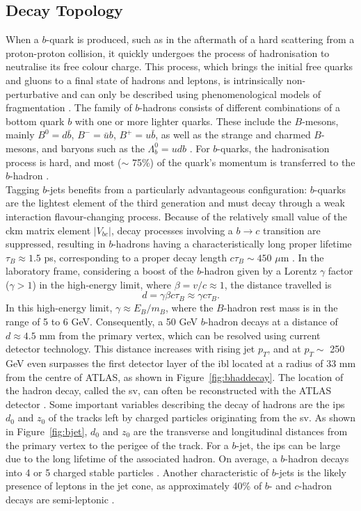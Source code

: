 \subsection{Decay Topology}
When a $b$-quark is produced, such as in the aftermath of a hard scattering from a proton-proton collision, it quickly undergoes the process of hadronisation to neutralise its free colour charge. This process, which brings the initial free quarks and gluons to a final state of hadrons and leptons, is intrinsically non-perturbative and can only be described using phenomenological models of fragmentation \cite{Webber:419784}. The family of $b$-hadrons consists of different combinations of a bottom quark $b$ with one or more lighter quarks. These include the $B$-mesons, mainly $B^0=d\bar{b}$, $B^-=\bar{u}b$, $B^+=u\bar{b}$, as well as the strange and charmed $B$-mesons, and baryons such as the $\Lambda_b^0=udb$ \cite{ATL-PHYS-PUB-2014-008}. For $b$-quarks, the hadronisation process is hard, and most ($\sim$ 75\%) of the quark's momentum is transferred to the $b$-hadron \cite{Webber:419784}. \\

Tagging $b$-jets benefits from a particularly advantageous configuration: $b$-quarks are the lightest element of the third generation and must decay through a weak interaction flavour-changing process. Because of the relatively small value of the \gls{ckm} matrix element $|V_{bc}|$, decay processes involving a $b \rightarrow c$ transition are suppressed, resulting in $b$-hadrons having a characteristically long proper lifetime $\tau_B \approx 1.5$ ps, corresponding to a proper decay length $c\tau_{B} \sim 450$ $\mu$m \cite{Tanabashi:2018oca}. In the laboratory frame, considering a boost of the $b$-hadron given by a Lorentz $\gamma$ factor ($\gamma > 1$) in the high-energy limit, where $\beta = v/c \approx 1$, the distance travelled is \[d = \gamma \beta c \tau_B \approx \gamma c \tau_B.\] In this high-energy limit, $\gamma \approx E_B / m_B$, where the $B$-hadron rest mass is in the range of 5 to 6 GeV. Consequently, a 50 GeV $b$-hadron decays at a distance of $d \approx 4.5$ mm from the primary vertex, which can be resolved using current detector technology. This distance increases with rising jet $p_T$, and at $p_T \sim$ 250 GeV even surpasses the first detector layer of the \gls{ibl} located at a radius of 33 mm from the centre of ATLAS, as shown in Figure~\ref{fig:bhaddecay}. The location of the hadron decay, called the \gls{sv}, can often be reconstructed with the ATLAS detector \cite{Aad:2019aic}. Some important variables describing the decay of hadrons are the \glspl{ip} $d_0$ and $z_0$ of the tracks left by charged particles originating from the \gls{sv}. As shown in Figure~\ref{fig:bjet}, $d_0$ and $z_0$ are the transverse and longitudinal distances from the primary vertex to the perigee of the track. For a $b$-jet, the \glspl{ip} can be large due to the long lifetime of the associated hadron. On average, a $b$-hadron decays into 4 or 5 charged stable particles \cite{ATL-PHYS-PUB-2014-008}. Another characteristic of $b$-jets is the likely presence of leptons in the jet cone, as approximately 40\% of $b$- and $c$-hadron decays are semi-leptonic \cite{Tanabashi:2018oca}. \\

